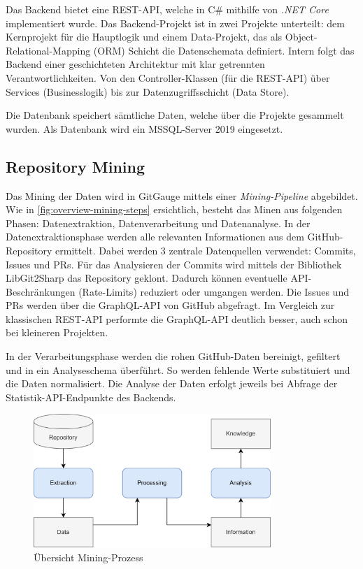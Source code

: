 Das Backend bietet eine REST-API, welche in C\# mithilfe von \textit{.NET Core} implementiert wurde. Das Backend-Projekt ist in zwei Projekte unterteilt: dem Kernprojekt für die Hauptlogik und einem Data-Projekt, das als Object-Relational-Mapping (ORM) Schicht die Datenschemata definiert. Intern folgt das Backend einer geschichteten Architektur mit klar getrennten Verantwortlichkeiten. Von den Controller-Klassen (für die REST-API) über Services (Businesslogik) bis zur Datenzugriffsschicht (Data Store). \parencite{grand_joel_vt1_joelgrand_repository_2024}

Die Datenbank speichert sämtliche Daten, welche über die Projekte gesammelt wurden. Als Datenbank wird ein MSSQL-Server 2019 eingesetzt. \parencite{grand_joel_vt1_joelgrand_repository_2024}

\subsection{Repository Mining}
Das Mining der Daten wird in GitGauge mittels einer \textit{Mining-Pipeline} abgebildet. Wie in \autoref{fig:overview-mining-steps} ersichtlich, besteht das Minen aus folgenden Phasen: Datenextraktion, Datenverarbeitung und Datenanalyse. 
In der Datenextraktionsphase werden alle relevanten Informationen aus dem GitHub-Repository ermittelt. Dabei werden 3 zentrale Datenquellen verwendet: Commits, Issues und PRs. Für das Analysieren der Commits wird mittels der Bibliothek LibGit2Sharp das Repository geklont. Dadurch können eventuelle API-Beschränkungen (Rate-Limits) reduziert oder umgangen werden. Die Issues und PRs werden über die GraphQL-API von GitHub abgefragt. Im Vergleich zur klassischen REST-API performte die GraphQL-API deutlich besser, auch schon bei kleineren Projekten.  

In der Verarbeitungsphase werden die rohen GitHub-Daten bereinigt, gefiltert und in ein Analyseschema überführt. So werden fehlende Werte substituiert und die Daten normalisiert. 
Die Analyse der Daten erfolgt jeweils bei Abfrage der Statistik-API-Endpunkte des Backends. 

\begin{figure}[htbp]
    \centering
    \includegraphics[width=0.8\textwidth]{Figures/uebersicht-mining-prozess.png}
    \caption{Übersicht Mining-Prozess \parencite{grand_joel_vt1_joelgrand_repository_2024}}
    \label{fig:overview-mining-steps}
\end{figure}

\pagebreak
